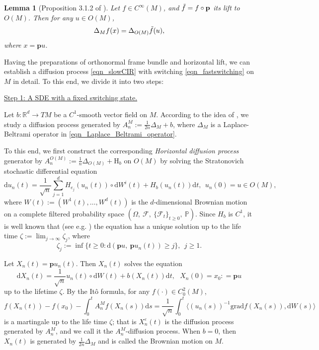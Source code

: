 \documentclass[a4paper]{article}
\numberwithin{equation}{section}
\newtheorem{lemma}[theorem]{Lemma}
\theoremstyle{definition}
\begin{document}
\begin{lemma}[Proposition 3.1.2 of \cite{H2002MR1882015}]
	Let $f\in C^{\infty}(M)$, and $\Tilde{f}=f\circ \mathbf{p}$ its lift to $O(M)$. Then for any $u\in O(M)$,
	\begin{equation*}
		\Delta_Mf(x)=\Delta_{O(M)}\Tilde{f}(u),
	\end{equation*}
	where $x=\mathbf{p}u$.
\end{lemma}
\par
Having the preparations of orthonormal frame bundle and horizontal lift, we can establish a diffusion process \eqref{eqn_slowCIR} with switching \eqref{eqn_fastswitching} on $M$ in detail. To this end, we divide it into two steps:

\underline{Step 1: A SDE with a fixed switching state.} 

Let $b:\mathbb{R}^d\to TM$ be a $C^1$-smooth vector field on $M$. According to the idea of \cite[Section 2.1]{W2014MR3154951}, we study a diffusion process generated by $A^{M}_n:=\frac{1}{2n}\Delta_M+b$, where $\Delta_M$ is a Laplace-Beltrami operator in \eqref{eqn_Laplace_Beltrami_operator}.

	To this end, we first construct the corresponding \textit{Horizontal diffusion process} generator by 
	$A^{O(M)}_n:=\frac{1}{n}\Delta_{O(M)}+\mathrm{H}_{b}$ on $O(M)$ by solving the
	Stratonovich stochastic differential equation 
	\begin{equation*}
		\mathrm{d}u_n(t)=\frac{1}{\sqrt{n}}\sum_{j=1}^d H_{e_j}(u_n(t))\circ \mathrm{d}W^i(t)+{H}_{b}(u_n(t))\mathrm{d}t,~~u_n(0)=u\in O(M),
	\end{equation*}
	where $W(t):=(W^1(t),\ldots,W^d(t))$ is the $d$-dimensional Brownian motion on a complete filtered probability space $(\Omega,~\mathcal{F},~\{\mathcal{F}_t\}_{t\geq 0},~\mathbb{P})$. Since ${H}_b$ is $C^1$, it is well known that (see e.g. \cite[Chapter IV, Section 6]{E1982MR675100}) the equation has a unique solution up to the life time $\zeta:= \lim_{j\to \infty} \zeta_j$, where
	\begin{equation*}
		\zeta_j:=\inf\{t\geq 0:\mathrm{d}(\mathbf{p}u,~\mathbf{p}u_n(t))\geq j\},~~j\geq 1.
	\end{equation*}
	
	Let $X_n(t)=\mathbf{p} u_n(t)$. Then $X_n(t)$ solves the equation
	\begin{equation}\label{eqn_SDEmanifold}
		\mathrm{d}X_n(t)=\frac{1}{\sqrt{n}}u_n(t) \circ\mathrm{d}W(t)+b(X_n(t))\mathrm{d}t,~~~X_n(0)=x_0: =\mathbf{p}u
	\end{equation}
	up to the lifetime $\zeta$.
	By the It\^{o} formula, for any $f(\cdot)\in C^2_0(M)$,
	\begin{equation*}
		f(X_n(t))-f(x_0)-\int^t_0A_n^{M}f(X_n(s))\mathrm{d}s=\frac{1}{\sqrt{n}}\int^t_0\langle (u_n(s))^{-1
		}\mathrm{grad}f(X_n(s)),\mathrm{d}W(s)\rangle
	\end{equation*}
	is a martingale up to the life time $\zeta$; that is $X^\varepsilon_n(t)$ is the diffusion process generated by $A^M_n$, and we call it the $A^M_n$-diffusion process. When $b=0$, then $X_n(t)$ is generated by $\frac{1}{2n}\Delta_M$ and is called the Brownian motion on $M$.
	
\end{document}
